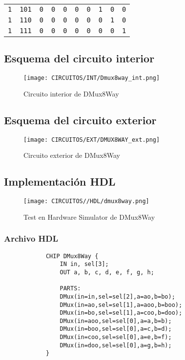 \documentclass[12pt]{article}
\begin{document}
\begin{table}[H]
{\begin{tabular}{@{}llllllllll@{}}
					\texttt{1} & \texttt{101} & \texttt{0} & \texttt{0} & \texttt{0} & \texttt{0} & \texttt{0} & \texttt{1} & \texttt{0} & \texttt{0} \\
					\texttt{1} & \texttt{110} & \texttt{0} & \texttt{0} & \texttt{0} & \texttt{0} & \texttt{0} & \texttt{0} & \texttt{1} & \texttt{0} \\
					\texttt{1} & \texttt{111} & \texttt{0} & \texttt{0} & \texttt{0} & \texttt{0} & \texttt{0} & \texttt{0} & \texttt{0} & \texttt{1} \\ \bottomrule
				\end{tabular}%
			}
		\end{table}



		\subsection{Esquema del circuito interior}
		\begin{figure}[H]
			\centering
			\texttt{[image: CIRCUITOS/INT/Dmux8way\_int.png]}            \caption{Circuito interior de DMux8Way \cite{circuitverse}}
			\label{fig:dmux8way_int}
		\end{figure}
		\subsection{Esquema del circuito exterior}
		\begin{figure}[H]
			\centering
			\texttt{[image: CIRCUITOS/EXT/DMUX8WAY\_ext.png]}            \caption{Circuito exterior de DMux8Way \cite{circuitverse}}
			\label{fig:dmux8way_ext}
		\end{figure}
		\subsection{Implementación HDL}
		\begin{figure}[H]
			\centering
			\texttt{[image: CIRCUITOS//HDL/dmux8way.png]}
			\caption{Test en Hardware Simulator de DMux8Way \cite{nand2tetris}}
			\label{fig:hdldmux8way}
		\end{figure}
		\subsubsection{Archivo HDL}
		\begin{lstlisting}
			CHIP DMux8Way {
				IN in, sel[3];
				OUT a, b, c, d, e, f, g, h;

				PARTS:
				DMux(in=in,sel=sel[2],a=ao,b=bo);
				DMux(in=ao,sel=sel[1],a=aoo,b=boo);
				DMux(in=bo,sel=sel[1],a=coo,b=doo);
				DMux(in=aoo,sel=sel[0],a=a,b=b);
				DMux(in=boo,sel=sel[0],a=c,b=d);
				DMux(in=coo,sel=sel[0],a=e,b=f);
				DMux(in=doo,sel=sel[0],a=g,b=h);
			}
		\end{lstlisting}
		\newpage
\end{document}
